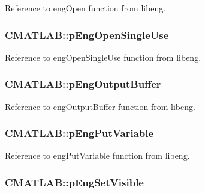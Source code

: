 Reference to eng\-Open function from libeng. 

\hypertarget{class_c_m_a_t_l_a_b_a7b65b3c713cf0ace9fe135b94f2ee007}{
\subsubsection[{p\-Eng\-Open\-Single\-Use}]{ C\-M\-A\-T\-L\-A\-B\-::p\-Eng\-Open\-Single\-Use\hspace{0.3cm}{\ttfamily [private]}}}\label{class_c_m_a_t_l_a_b_a7b65b3c713cf0ace9fe135b94f2ee007}


Reference to eng\-Open\-Single\-Use function from libeng. 

\hypertarget{class_c_m_a_t_l_a_b_a41eefdf98cf7dca3f766c3378b022746}{
\subsubsection[{p\-Eng\-Output\-Buffer}]{ C\-M\-A\-T\-L\-A\-B\-::p\-Eng\-Output\-Buffer\hspace{0.3cm}{\ttfamily [private]}}}\label{class_c_m_a_t_l_a_b_a41eefdf98cf7dca3f766c3378b022746}


Reference to eng\-Output\-Buffer function from libeng. 

\hypertarget{class_c_m_a_t_l_a_b_a2f377cb3dad070f45b0fe6f971f0a8c5}{
\subsubsection[{p\-Eng\-Put\-Variable}]{ C\-M\-A\-T\-L\-A\-B\-::p\-Eng\-Put\-Variable\hspace{0.3cm}{\ttfamily [private]}}}\label{class_c_m_a_t_l_a_b_a2f377cb3dad070f45b0fe6f971f0a8c5}


Reference to eng\-Put\-Variable function from libeng. 

\hypertarget{class_c_m_a_t_l_a_b_aacae3122e2253226427bf5ea2d773a7e}{
\subsubsection[{p\-Eng\-Set\-Visible}]{ C\-M\-A\-T\-L\-A\-B\-::p\-Eng\-Set\-Visible\hspace{0.3cm}{\ttfamily [private]}}}\label{class_c_m_a_t_l_a_b_aacae3122e2253226427bf5ea2d773a7e}


